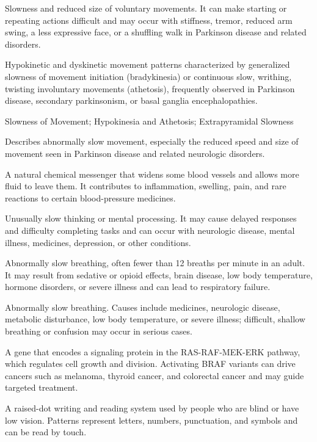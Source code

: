  Slowness and reduced size of voluntary movements. It can make starting or repeating actions difficult and may occur with stiffness, tremor, reduced arm swing, a less expressive face, or a shuffling walk in Parkinson disease and related disorders.

 Hypokinetic and dyskinetic movement patterns characterized by generalized slowness of movement initiation (bradykinesia) or continuous slow, writhing, twisting involuntary movements (athetosis), frequently observed in Parkinson disease, secondary parkinsonism, or basal ganglia encephalopathies.

\synonyms
Slowness of Movement; Hypokinesia and Athetosis; Extrapyramidal Slowness

 Describes abnormally slow movement, especially the reduced speed and size of movement seen in Parkinson disease and related neurologic disorders.

 A natural chemical messenger that widens some blood vessels and allows more fluid to leave them. It contributes to inflammation, swelling, pain, and rare reactions to certain blood-pressure medicines.

 Unusually slow thinking or mental processing. It may cause delayed responses and difficulty completing tasks and can occur with neurologic disease, mental illness, medicines, depression, or other conditions.

 Abnormally slow breathing, often fewer than 12 breaths per minute in an adult. It may result from sedative or opioid effects, brain disease, low body temperature, hormone disorders, or severe illness and can lead to respiratory failure.

 Abnormally slow breathing. Causes include medicines, neurologic disease, metabolic disturbance, low body temperature, or severe illness; difficult, shallow breathing or confusion may occur in serious cases.

 A gene that encodes a signaling protein in the RAS-RAF-MEK-ERK pathway, which regulates cell growth and division. Activating BRAF variants can drive cancers such as melanoma, thyroid cancer, and colorectal cancer and may guide targeted treatment.

 A raised-dot writing and reading system used by people who are blind or have low vision. Patterns represent letters, numbers, punctuation, and symbols and can be read by touch.

